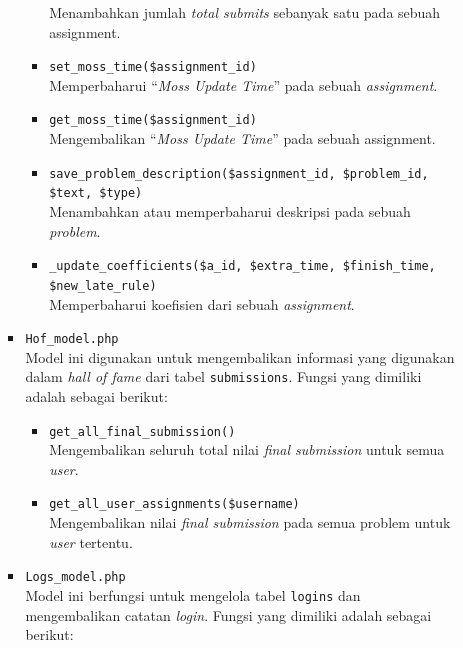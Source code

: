 \documentclass[a4paper,twoside]{article}
\begin{document}
\begin{enumerate}
\begin{itemize}
\begin{itemize}
\begin{itemize}
				                        Menambahkan jumlah \textit{total submits} sebanyak satu pada sebuah assignment.
				                  \item \verb|set_moss_time($assignment_id)| \\
				                        Memperbaharui ``\textit{Moss Update Time}'' pada sebuah \textit{assignment}.
				                  \item \verb|get_moss_time($assignment_id)| \\
				                        Mengembalikan ``\textit{Moss Update Time}'' pada sebuah assignment.
				                  \item \verb|save_problem_description($assignment_id, $problem_id, $text, $type)| \\
				                        Menambahkan atau memperbaharui deskripsi pada sebuah \textit{problem}.
				                  \item \verb|_update_coefficients($a_id, $extra_time, $finish_time, $new_late_rule)| \\
				                        Memperbaharui koefisien dari sebuah \textit{assignment}.
			                  \end{itemize}

			            \item \verb|Hof_model.php| \\
			                  Model ini digunakan untuk mengembalikan informasi yang digunakan dalam \textit{hall of fame} dari tabel \verb|submissions|. Fungsi yang dimiliki adalah sebagai berikut:

			                  \begin{itemize}
				                  \item \verb|get_all_final_submission()| \\
				                        Mengembalikan seluruh total nilai \textit{final submission} untuk semua \textit{user}.
				                  \item \verb|get_all_user_assignments($username)| \\
				                        Mengembalikan nilai \textit{final submission} pada semua problem untuk \textit{user} tertentu.
			                  \end{itemize}

			            \item \verb|Logs_model.php| \\
			                  Model ini berfungsi untuk mengelola tabel \verb|logins| dan mengembalikan catatan \textit{login}. Fungsi yang dimiliki adalah sebagai berikut:


\end{itemize}
\end{itemize}
\end{enumerate}
\end{document}
